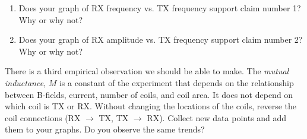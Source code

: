 \documentclass[12pt,twocolumn]{article}
\begin{document}
\begin{enumerate}
\item Does your graph of RX frequency vs. TX frequency support claim number 1?  Why or why not? \\ \vspace{3cm}
\item Does your graph of RX amplitude vs. TX frequency support claim number 2?  Why or why not? \\
\vspace{3cm}
\end{enumerate}

There is a third empirical observation we should be able to make.  The \textit{mutual inductance}, $M$ is a constant of the experiment that depends on the relationship between B-fields, current, number of coils, and coil area.  It does not depend on which coil is TX or RX.  Without changing the locations of the coils, reverse the coil connections (RX $\to$ TX, TX $\to$ RX).  Collect new data points and add them to your graphs.  Do you observe the same trends?
\end{document}
